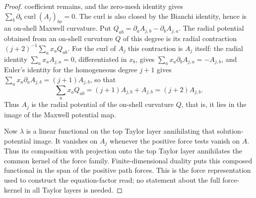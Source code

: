 \begin{proof}
coefficient remains, and the zero-mesh identity gives
$\sum_b\partial_b\operatorname{curl}(A_j)_{b\nu}=0$. The curl is also
closed by the Bianchi identity, hence is an on-shell Maxwell curvature.
Put $Q_{ab}=\partial_aA_{j,b}-\partial_bA_{j,a}$. The radial potential
obtained from an on-shell curvature $Q$ of this degree is its radial
contraction $(j+2)^{-1}\sum_ax_aQ_{ab}$. For the curl of $A_j$ this
contraction is $A_j$ itself: the radial identity
$\sum_ax_aA_{j,a}=0$, differentiated in $x_b$, gives
$\sum_ax_a\partial_bA_{j,a}=-A_{j,b}$, and Euler's identity for the
homogeneous degree $j+1$ gives $\sum_ax_a\partial_aA_{j,b}=(j+1)A_{j,b}$,
so that
\[
 \sum_ax_aQ_{ab}=(j+1)A_{j,b}+A_{j,b}=(j+2)A_{j,b}.
\]
Thus $A_j$ is the radial potential of the on-shell curvature $Q$, that
is, it lies in the image of the Maxwell potential map.

Now $\lambda$ is a linear functional on the top Taylor layer annihilating
that solution-potential image. It vanishes on $A_j$ whenever the positive
force tests vanish on $A$. Thus its composition with projection onto the
top Taylor layer annihilates the common kernel of the force family.
Finite-dimensional duality puts this composed functional in the span of
the positive path forces. This is the force representation used to
construct the equation-factor read; no statement about the full
force-kernel in all Taylor layers is needed.


\end{proof}
